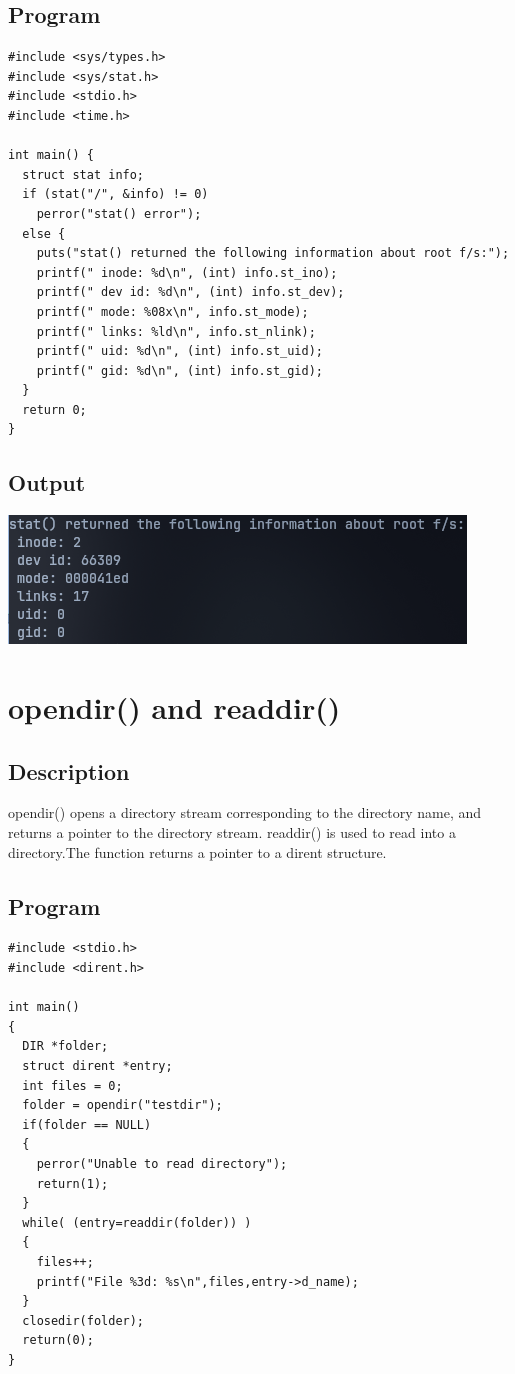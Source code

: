\subsection{Program}
\begin{lstlisting}[label={list:c_program:exit}]
#include <sys/types.h>
#include <sys/stat.h>
#include <stdio.h>
#include <time.h>

int main() {
  struct stat info;
  if (stat("/", &info) != 0)
    perror("stat() error");
  else {
    puts("stat() returned the following information about root f/s:");
    printf(" inode: %d\n", (int) info.st_ino);
    printf(" dev id: %d\n", (int) info.st_dev);
    printf(" mode: %08x\n", info.st_mode);
    printf(" links: %ld\n", info.st_nlink);
    printf(" uid: %d\n", (int) info.st_uid);
    printf(" gid: %d\n", (int) info.st_gid);
  }
  return 0;
}
\end{lstlisting}

\subsection{Output}
\includegraphics[]{Cycle_1//Outputs/stat.png}

\section{opendir() and readdir()}
\subsection{Description}
opendir() opens a directory stream corresponding to the directory name, and
returns a pointer to the directory stream. readdir() is used to read into a
directory.The function returns a pointer to a dirent structure.
\subsection{Program}
\begin{lstlisting}[label={list:c_program:exit}]
#include <stdio.h>
#include <dirent.h>

int main()
{
  DIR *folder;
  struct dirent *entry;
  int files = 0;
  folder = opendir("testdir");
  if(folder == NULL)
  {
    perror("Unable to read directory");
    return(1);
  }
  while( (entry=readdir(folder)) )
  {
    files++;
    printf("File %3d: %s\n",files,entry->d_name);
  }
  closedir(folder);
  return(0);
}
\end{lstlisting}

